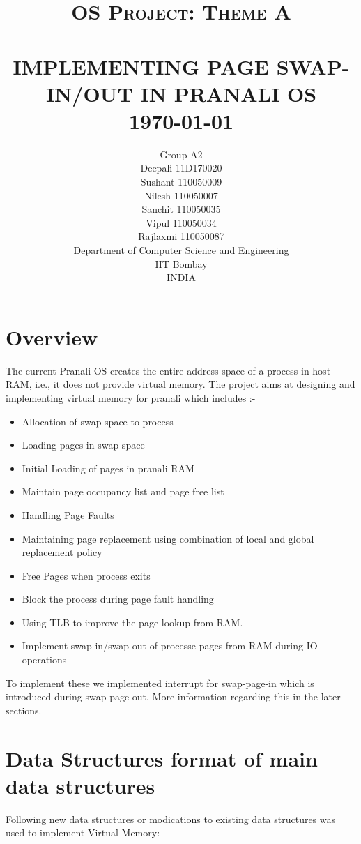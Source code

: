 \documentclass[paper=a4, fontsize=11pt,twoside]{scrartcl}   %
\title{ \normalsize \textsc{OS Project: Theme A }   %
            \\[2.0cm]                               %
            \HRule{0.5pt} \\                        %
            \LARGE \textbf{\uppercase{Implementing page swap-in/out in Pranali OS}} %
            \HRule{2pt} \\ [0.5cm]      %
            \normalsize \today          %
        }
\author{
        Group A2 \\
        Deepali 11D170020\\
        Sushant 110050009\\
        Nilesh 110050007\\
        Sanchit 110050035\\
        Vipul 110050034\\
        Rajlaxmi 110050087\\        
        Department of Computer Science and Engineering\\
        IIT Bombay\\
        INDIA\\
}
\makeatletter
\def\printtitle{%
    {\centering \@title\par}}
\def\printauthor{%
    {\centering \large \@author}}
\makeatother
\begin{document}
\thispagestyle{empty}       %

\printtitle                 %
    \vfill
\printauthor                %
\newpage
\tableofcontents
\newpage
\setcounter{page}{1}        %
\section{Overview}

The current Pranali OS creates the entire address space of a process in host RAM, i.e., it does not provide virtual memory. The project aims at designing and implementing virtual memory for pranali which includes :-

\begin{itemize}
\item Allocation of swap space to process
\item Loading pages in swap space
\item Initial Loading of pages in pranali RAM
\item Maintain page occupancy list and page free list
\item Handling Page Faults
\item Maintaining page replacement using combination of local and global replacement policy
\item Free Pages when process exits
\item Block the process during page fault handling
\item Using TLB to improve the page lookup from RAM.
\item Implement swap-in/swap-out of processe pages from RAM during IO operations
\end{itemize}


To implement these we implemented interrupt for swap-page-in which is introduced during swap-page-out. More information regarding this in the later sections.
\newpage
\section{Data Structures format of main data structures}
Following new data structures or modications to existing data structures was used to implement Virtual Memory:
\end{document}
